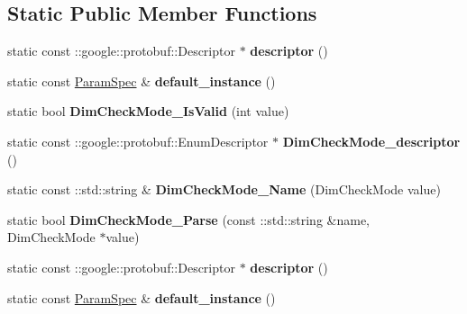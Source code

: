 \subsection*{Static Public Member Functions}
\begin{DoxyCompactItemize}
\item 
\mbox{\label{classcaffe_1_1_param_spec_aa551b8818282074c56539f58839f2983}} 
static const \+::google\+::protobuf\+::\+Descriptor $\ast$ {\bfseries descriptor} ()
\item 
\mbox{\label{classcaffe_1_1_param_spec_ad3f5edc1d995b0d3cb9ff0f065daac49}} 
static const \mbox{\hyperlink{classcaffe_1_1_param_spec}{Param\+Spec}} \& {\bfseries default\+\_\+instance} ()
\item 
\mbox{\label{classcaffe_1_1_param_spec_aa50c09a24412889a2899e84bc4871fea}} 
static bool {\bfseries Dim\+Check\+Mode\+\_\+\+Is\+Valid} (int value)
\item 
\mbox{\label{classcaffe_1_1_param_spec_abbda783bae74833e5c309ed32feb22da}} 
static const \+::google\+::protobuf\+::\+Enum\+Descriptor $\ast$ {\bfseries Dim\+Check\+Mode\+\_\+descriptor} ()
\item 
\mbox{\label{classcaffe_1_1_param_spec_a3ed2b779a8062a2e448d5e9fccf0868a}} 
static const \+::std\+::string \& {\bfseries Dim\+Check\+Mode\+\_\+\+Name} (Dim\+Check\+Mode value)
\item 
\mbox{\label{classcaffe_1_1_param_spec_a444e596b7ebbec00ab22558d30e62871}} 
static bool {\bfseries Dim\+Check\+Mode\+\_\+\+Parse} (const \+::std\+::string \&name, Dim\+Check\+Mode $\ast$value)
\item 
\mbox{\label{classcaffe_1_1_param_spec_a72bd35d03746ed397a330b5e02e6c593}} 
static const \+::google\+::protobuf\+::\+Descriptor $\ast$ {\bfseries descriptor} ()
\item 
\mbox{\label{classcaffe_1_1_param_spec_ac3b59adc4c765cce7f2c26473d1fad73}} 
static const \mbox{\hyperlink{classcaffe_1_1_param_spec}{Param\+Spec}} \& {\bfseries default\+\_\+instance} ()

\end{DoxyCompactItemize}
